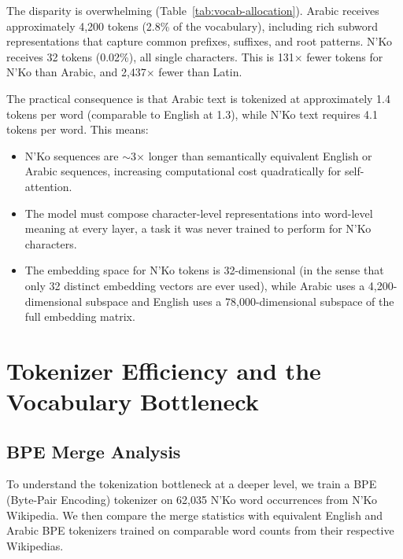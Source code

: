 \documentclass[11pt]{article}
\begin{document}
The disparity is overwhelming (Table~\ref{tab:vocab-allocation}).
Arabic receives approximately 4,200 tokens (2.8\% of the vocabulary), including rich subword representations that capture common prefixes, suffixes, and root patterns.
N'Ko receives 32 tokens (0.02\%), all single characters.
This is 131$\times$ fewer tokens for N'Ko than Arabic, and 2,437$\times$ fewer than Latin.

The practical consequence is that Arabic text is tokenized at approximately 1.4 tokens per word (comparable to English at 1.3), while N'Ko text requires 4.1 tokens per word.
This means:
\begin{itemize}
\item N'Ko sequences are $\sim$3$\times$ longer than semantically equivalent English or Arabic sequences, increasing computational cost quadratically for self-attention.
\item The model must compose character-level representations into word-level meaning at every layer, a task it was never trained to perform for N'Ko characters.
\item The embedding space for N'Ko tokens is 32-dimensional (in the sense that only 32 distinct embedding vectors are ever used), while Arabic uses a 4,200-dimensional subspace and English uses a 78,000-dimensional subspace of the full embedding matrix.
\end{itemize}

\section{Tokenizer Efficiency and the Vocabulary Bottleneck}
\label{sec:tokenizer}

\subsection{BPE Merge Analysis}

To understand the tokenization bottleneck at a deeper level, we train a BPE (Byte-Pair Encoding) tokenizer \cite{sennrich2016bpe} on 62,035 N'Ko word occurrences from N'Ko Wikipedia.
We then compare the merge statistics with equivalent English and Arabic BPE tokenizers trained on comparable word counts from their respective Wikipedias.
\end{document}

